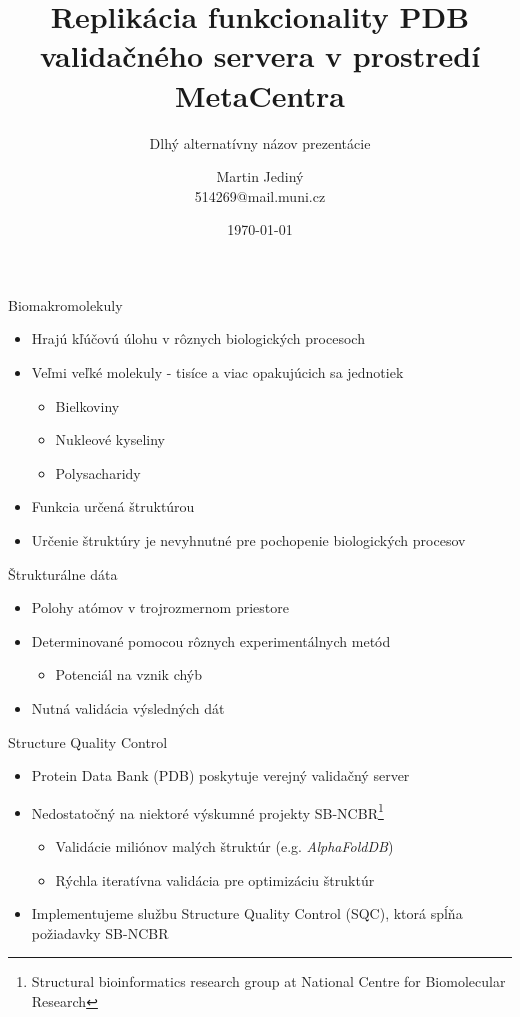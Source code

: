 \documentclass[
  aspectratio=169,
]{beamer}
\title[Structure Quality Control]{Replikácia funkcionality PDB validačného servera v prostredí MetaCentra}
\subtitle[Alternatívny názov prezentácie]{Dlhý alternatívny názov prezentácie}
\author[M.\, Jediný]{Martin Jediný\texorpdfstring{\\}{, }514269@mail.muni.cz}
\institute[FI MU]{Fakulta informatiky Masarykovej univerzity}
\date{\today}
\begin{document}
\begin{frame}[plain]
\maketitle
\end{frame}

\begin{frame}{Biomakromolekuly}
\begin{itemize}
  \item Hrajú kľúčovú úlohu v rôznych biologických procesoch
  \item Veľmi veľké molekuly - tisíce a viac opakujúcich sa jednotiek
  \begin{itemize}
    \item Bielkoviny
    \item Nukleové kyseliny
    \item Polysacharidy
  \end{itemize}
  \item Funkcia určená štruktúrou
  \item Určenie štruktúry je nevyhnutné pre pochopenie biologických procesov
\end{itemize}
\end{frame}

\begin{frame}{Štrukturálne dáta}
\begin{itemize}
  \item Polohy atómov v trojrozmernom priestore
  \item Determinované pomocou rôznych experimentálnych metód
  \begin{itemize}
    \item Potenciál na vznik chýb
  \end{itemize}
  \item Nutná validácia výsledných dát
\end{itemize}
\end{frame}

\begin{frame}{Structure Quality Control}
\begin{itemize}
  \item Protein Data Bank (PDB) poskytuje verejný validačný server 
  \item Nedostatočný na niektoré výskumné projekty SB-NCBR\footnote{Structural bioinformatics research group at National Centre for Biomolecular Research}
  \begin{itemize}
    \item Validácie miliónov malých štruktúr (e.g. \emph{AlphaFoldDB})
    \item Rýchla iteratívna validácia pre optimizáciu štruktúr
  \end{itemize}
  \item Implementujeme službu Structure Quality Control (SQC), ktorá spĺňa požiadavky SB-NCBR
\end{itemize}
\end{frame}
\end{document}
